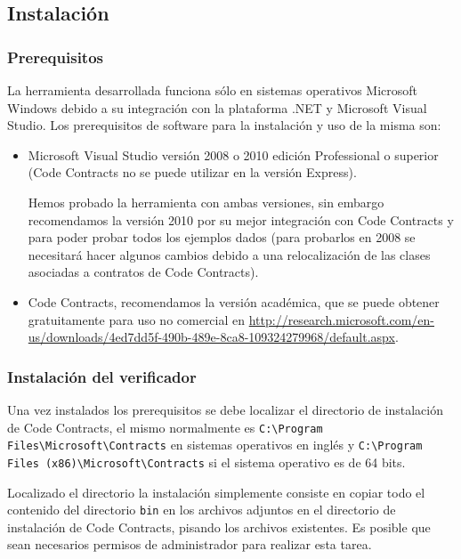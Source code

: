 \documentclass[12pt,a4paper]{article}
\newcommand\mono[1]{\texttt{#1}}
\begin{document}
		\subsection{Instalación}
				\subsubsection{Prerequisitos}
					La herramienta desarrollada funciona sólo en sistemas operativos Microsoft Windows debido a su integración con la plataforma .NET y Microsoft Visual Studio. Los prerequisitos de software para la instalación y uso de la misma son:
					\begin{itemize}
						\item
							Microsoft Visual Studio versión 2008 o 2010 edición Professional o superior (Code Contracts no se puede utilizar en la versión Express).

							Hemos probado la herramienta con ambas versiones, sin embargo recomendamos la versión 2010 por su mejor integración con Code Contracts y para poder probar todos los ejemplos dados (para probarlos en 2008 se necesitará hacer algunos cambios debido a una relocalización de las clases asociadas a contratos de Code Contracts).
						\item Code Contracts, recomendamos la versión académica, que se puede obtener gratuitamente para uso no comercial en \url{http://research.microsoft.com/en-us/downloads/4ed7dd5f-490b-489e-8ca8-109324279968/default.aspx}.
					\end{itemize}
				\subsubsection{Instalación del verificador}
					Una vez instalados los prerequisitos se debe localizar el directorio de instalación de Code Contracts, el mismo normalmente es \mono{C:\textbackslash{}Program Files\textbackslash{}Microsoft\textbackslash{}Contracts} en sistemas operativos en inglés y \mono{C:\textbackslash{}Program Files (x86)\textbackslash{}Microsoft\textbackslash{}Contracts} si el sistema operativo es de 64 bits.

					Localizado el directorio la instalación simplemente consiste en copiar todo el contenido del directorio \mono{bin} en los archivos adjuntos en el directorio de instalación de Code Contracts, pisando los archivos existentes. Es posible que sean necesarios permisos de administrador para realizar esta tarea.
\end{document}
